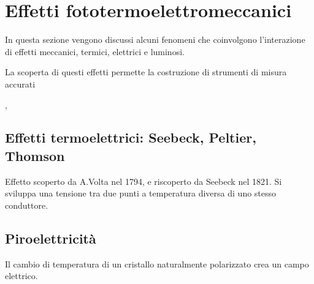 \documentclass[letterpaper,10pt,italian]{jupyterBook}
\begin{document}
\sphinxstepscope


\chapter{Effetti foto\sphinxhyphen{}termo\sphinxhyphen{}elettro\sphinxhyphen{}meccanici}
\label{\detokenize{ch/electromagnetism/thermoelectric-effects:effetti-foto-termo-elettro-meccanici}}\label{\detokenize{ch/electromagnetism/thermoelectric-effects:physics-hs-electromagnetism-thermoelectric-effects}}\label{\detokenize{ch/electromagnetism/thermoelectric-effects::doc}}
\sphinxAtStartPar
In questa sezione vengono discussi alcuni fenomeni che coinvolgono l’interazione di effetti meccanici, termici, elettrici e luminosi.

\sphinxAtStartPar
{} 

\sphinxAtStartPar
La scoperta di questi effetti permette la costruzione di strumenti di misura accurati   

\sphinxAtStartPar
{} , 


\section{Effetti termoelettrici: Seebeck, Peltier, Thomson}
\label{\detokenize{ch/electromagnetism/thermoelectric-effects:effetti-termoelettrici-seebeck-peltier-thomson}}
\sphinxAtStartPar
{} Effetto scoperto da A.Volta nel 1794, e riscoperto da Seebeck nel 1821.
Si sviluppa una tensione tra due punti a temperatura diversa di uno stesso conduttore.

\sphinxAtStartPar
{}  

\sphinxAtStartPar
{}


\section{Piroelettricità}
\label{\detokenize{ch/electromagnetism/thermoelectric-effects:piroelettricita}}\label{\detokenize{ch/electromagnetism/thermoelectric-effects:physics-hs-modern-intro-experiences-pyroel}}
\sphinxAtStartPar
Il cambio di temperatura di un cristallo naturalmente polarizzato crea un campo elettrico.
\end{document}
